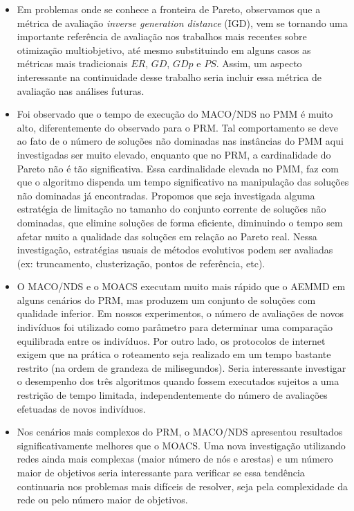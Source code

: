 \begin{itemize}
	\item Em problemas onde se conhece a fronteira de Pareto, observamos que a métrica de avaliação \textit{inverse generation distance} (IGD), vem se tornando uma importante referência de avaliação nos trabalhos mais recentes sobre otimização multiobjetivo, até mesmo substituindo em alguns casos as métricas mais tradicionais $ER$, $GD$, $GDp$ e $PS$. Assim, um aspecto interessante na continuidade desse trabalho seria incluir essa métrica de avaliação nas análises futuras.
	
	\item Foi observado que o tempo de execução do MACO/NDS no PMM é muito alto, diferentemente do observado para o PRM. Tal comportamento se deve ao fato de o número de soluções não dominadas nas instâncias do PMM aqui investigadas ser muito elevado, enquanto que no PRM, a cardinalidade do Pareto não é tão significativa. Essa cardinalidade elevada no PMM, faz com que o algoritmo dispenda um tempo significativo na manipulação das soluções não dominadas já encontradas. Propomos que seja investigada alguma estratégia de limitação no tamanho do conjunto corrente de soluções não dominadas, que elimine soluções de forma eficiente, diminuindo o tempo sem afetar muito a qualidade das soluções em relação ao Pareto real. Nessa investigação, estratégias usuais de métodos evolutivos podem ser avaliadas (ex: truncamento, clusterização, pontos de referência, etc).

	\item O MACO/NDS e o MOACS executam muito mais rápido que o AEMMD em alguns cenários do PRM, mas produzem um conjunto de soluções com qualidade inferior. Em nossos experimentos, o número de avaliações de novos indivíduos foi utilizado como parâmetro para determinar uma comparação equilibrada entre os indivíduos. Por outro lado, os protocolos de internet exigem que na prática o roteamento seja realizado em um tempo bastante restrito (na ordem de grandeza de milisegundos). Seria interessante investigar o desempenho dos três algoritmos quando fossem executados sujeitos a uma restrição de tempo limitada, independentemente do número de avaliações efetuadas de novos indivíduos.
	
	\item Nos cenários mais complexos do PRM, o MACO/NDS apresentou resultados significativamente melhores que o MOACS. Uma nova investigação utilizando redes ainda mais complexas (maior número de nós e arestas) e um número maior de objetivos seria interessante para verificar se essa tendência continuaria nos problemas mais difíceis de resolver, seja pela complexidade da rede ou pelo número maior de objetivos.


\end{itemize}
